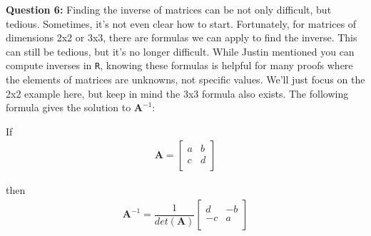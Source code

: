 \documentclass[12pt]{article}
\begin{document}
%
%


\textbf{Question 6:} Finding the inverse of matrices can be not only difficult, but tedious. Sometimes, it's not even clear how to start. Fortunately, for matrices of dimensions 2x2 or 3x3, there are formulas we can apply to find the inverse. This can still be tedious, but it's no longer difficult. While Justin mentioned you can compute inverses in \texttt{R}, knowing these formulas is helpful for many proofs where the elements of matrices are unknowns, not specific values. We'll just focus on the 2x2 example here, but keep in mind the 3x3 formula also exists. The following formula gives the solution to $\mathbf{A}^{-1}$:

If\\

\begin{eqnarray*}
 \mathbf{A}=
\begin{bmatrix} 
a&b  \\
c&d\\
\end{bmatrix}
\end{eqnarray*}

then\\

\begin{eqnarray*}
 \mathbf{A}^{-1}=\dfrac{1}{det(\mathbf{A})}
\begin{bmatrix} 
d&-b  \\
-c&a\\
\end{bmatrix}
\end{eqnarray*}
\end{document}
